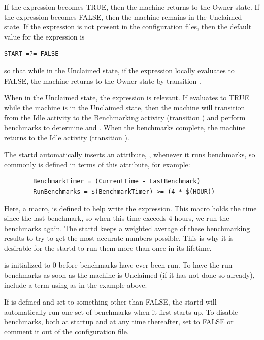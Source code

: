 If the  expression becomes TRUE, then the machine returns
to the Owner state.
If the  expression becomes FALSE, then the machine remains
in the Unclaimed state.
If the  expression is not present in the configuration files,
then the default value for the  expression is 
\begin{verbatim}
START =?= FALSE
\end{verbatim}
so that
while in the Unclaimed state, if the  expression locally
evaluates to FALSE, the machine returns to the Owner state by
transition .

When in the Unclaimed state,
the  \label{param:RunBenchmarks}  
expression is relevant.
If  evaluates to TRUE while the machine
is in the Unclaimed state,
then the machine will transition from the Idle
activity to the Benchmarking activity (transition ) and
perform benchmarks to determine  and .  
When the benchmarks complete, the machine returns to the Idle activity
(transition ).

The startd automatically inserts an attribute, ,
whenever it runs benchmarks, so commonly  is
defined in terms of this attribute, for example:
\begin{verbatim}
        BenchmarkTimer = (CurrentTime - LastBenchmark)
        RunBenchmarks = $(BenchmarkTimer) >= (4 * $(HOUR))
\end{verbatim}
Here, a macro,  is defined to help write the
expression.
This macro holds the time since the last benchmark,
so when this time exceeds 4 hours, we run the benchmarks again.
The startd keeps a weighted average of these benchmarking
results to try to get the most accurate numbers possible.
This is why
it is desirable for 
the startd to run them more than once in its lifetime.

\Note {} is initialized to 0 before benchmarks
have ever been run.
To have the  run benchmarks as soon as the machine is
Unclaimed (if it has not done so already),
include a term using  as in the example above.

\Note If  is defined and set to something
other than FALSE, the startd will automatically run one set of
benchmarks when it first starts up.
To disable benchmarks, both at startup and at any time thereafter,
set  to FALSE or comment it out of the
configuration file.

